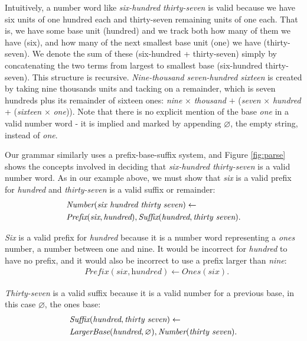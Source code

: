 \documentclass[10pt,letterpaper]{article}
\begin{document}
Intuitively, a number word like \emph{six-hundred thirty-seven} is
valid because we have six units of one hundred each and thirty-seven
remaining units of one each. That is, we have some base unit (hundred)
and we track both how many of them we have (six), and how many of the
next smallest base unit (one) we have (thirty-seven). We denote the
sum of these (six-hundred + thirty-seven) simply by concatenating the
two terms from largest to smallest base (six-hundred thirty-seven).
This structure is recursive. \emph{Nine-thousand seven-hundred
  sixteen} is created by taking nine thousands units and tacking on a
remainder, which is seven hundreds plus its remainder of sixteen ones:
\emph{nine} $\times$ \emph{thousand} $+$ (\emph{seven} $\times$
\emph{hundred} + (\emph{sixteen} $\times$ \emph{one})). Note that
there is no explicit mention of the base \emph{one} in a valid number
word - it is implied and marked by appending $\varnothing$, the empty
string, instead of \emph{one}.

Our grammar similarly uses a prefix-base-suffix system, and Figure
\ref{fig:parse} shows the concepts involved in deciding that
\emph{six-hundred thirty-seven} is a valid number word. As in our
example above, we must show that \emph{six} is a valid prefix for
\emph{hundred} and \emph{thirty-seven} is a valid suffix or remainder:
\setlength{\jot}{0}
\begin{align}
  & \textit{Number}(\textit{six hundred thirty seven}) \leftarrow\\
  & \textit{Prefix}(\textit{six}, \textit{hundred}), \textit{Suffix}(\textit{hundred}, \textit{thirty seven}).\notag
\end{align}

\noindent\emph{Six} is a valid prefix for \emph{hundred} because it is
a number word representing a \emph{ones} number, a number between one
and nine. It would be incorrect for \emph{hundred} to have no prefix,
and it would also be incorrect to use a prefix larger than
\emph{nine}:
\begin{align}
  & \textit{Prefix}(\textit{six}, \textit{hundred}) \leftarrow \textit{Ones}(\textit{six}).
\end{align}

\noindent\emph{Thirty-seven} is a valid suffix because it is a valid
number for a previous base, in this case $\varnothing$, the ones base:
\begin{align}
  & \textit{Suffix}(\textit{hundred}, \textit{thirty seven}) \leftarrow\\
  & \textit{LargerBase}(\textit{hundred}, \varnothing), \textit{Number}(\textit{thirty seven}).\notag
\end{align}
\end{document}
